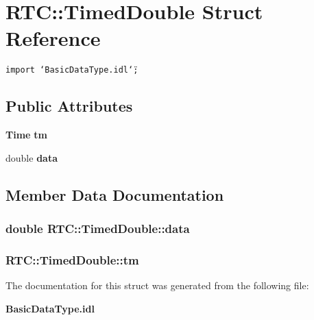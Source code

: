 \section{RTC::Timed\-Double Struct Reference}
\label{structRTC_1_1TimedDouble}
{\tt import \char`\"{}Basic\-Data\-Type.idl\char`\"{};}

\subsection*{Public Attributes}
\begin{CompactItemize}
\item 
{\bf Time} {\bf tm}
\item 
double {\bf data}
\end{CompactItemize}


\subsection{Member Data Documentation}
\subsubsection{\setlength{\rightskip}{0pt plus 5cm}double {\bf RTC::Timed\-Double::data}}\label{structRTC_1_1TimedDouble_RTC_1_1TimedDoubleo1}


\subsubsection{ {\bf RTC::Timed\-Double::tm}}\label{structRTC_1_1TimedDouble_RTC_1_1TimedDoubleo0}




The documentation for this struct was generated from the following file:\begin{CompactItemize}
\item 
{\bf Basic\-Data\-Type.idl}\end{CompactItemize}
